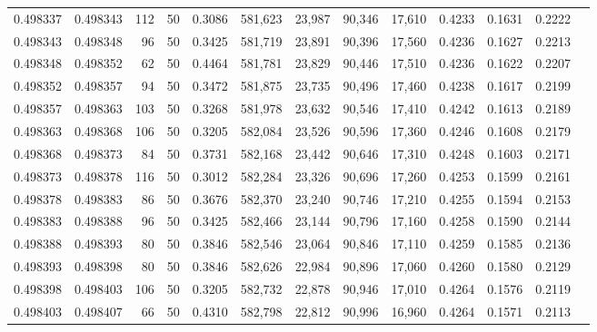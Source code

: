 \begin{tabular}{rrrrrrrrrrrrr}
0.498337 & 0.498343 &   112 &  50 &                                     0.3086 & 581,623 &  23,987 &  90,346 &  17,610 & 0.4233 & 0.1631 & 0.2222 \\
0.498343 & 0.498348 &    96 &  50 &                                     0.3425 & 581,719 &  23,891 &  90,396 &  17,560 & 0.4236 & 0.1627 & 0.2213 \\
0.498348 & 0.498352 &    62 &  50 &                                     0.4464 & 581,781 &  23,829 &  90,446 &  17,510 & 0.4236 & 0.1622 & 0.2207 \\
0.498352 & 0.498357 &    94 &  50 &                                     0.3472 & 581,875 &  23,735 &  90,496 &  17,460 & 0.4238 & 0.1617 & 0.2199 \\
0.498357 & 0.498363 &   103 &  50 &                                     0.3268 & 581,978 &  23,632 &  90,546 &  17,410 & 0.4242 & 0.1613 & 0.2189 \\
0.498363 & 0.498368 &   106 &  50 &                                     0.3205 & 582,084 &  23,526 &  90,596 &  17,360 & 0.4246 & 0.1608 & 0.2179 \\
0.498368 & 0.498373 &    84 &  50 &                                     0.3731 & 582,168 &  23,442 &  90,646 &  17,310 & 0.4248 & 0.1603 & 0.2171 \\
0.498373 & 0.498378 &   116 &  50 &                                     0.3012 & 582,284 &  23,326 &  90,696 &  17,260 & 0.4253 & 0.1599 & 0.2161 \\
0.498378 & 0.498383 &    86 &  50 &                                     0.3676 & 582,370 &  23,240 &  90,746 &  17,210 & 0.4255 & 0.1594 & 0.2153 \\
0.498383 & 0.498388 &    96 &  50 &                                     0.3425 & 582,466 &  23,144 &  90,796 &  17,160 & 0.4258 & 0.1590 & 0.2144 \\
0.498388 & 0.498393 &    80 &  50 &                                     0.3846 & 582,546 &  23,064 &  90,846 &  17,110 & 0.4259 & 0.1585 & 0.2136 \\
0.498393 & 0.498398 &    80 &  50 &                                     0.3846 & 582,626 &  22,984 &  90,896 &  17,060 & 0.4260 & 0.1580 & 0.2129 \\
0.498398 & 0.498403 &   106 &  50 &                                     0.3205 & 582,732 &  22,878 &  90,946 &  17,010 & 0.4264 & 0.1576 & 0.2119 \\
0.498403 & 0.498407 &    66 &  50 &                                     0.4310 & 582,798 &  22,812 &  90,996 &  16,960 & 0.4264 & 0.1571 & 0.2113 \\

\end{tabular}
